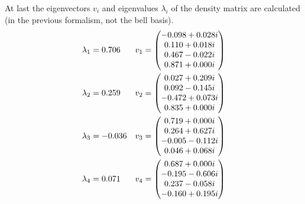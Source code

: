 At last the eigenvectors $v_i$ and eigenvalues $\lambda_i$ of the density matrix are calculated (in the previous formalism, not the bell basis).
\begin{align*}
\lambda_1
    &=\evala
    &v_1
    &=\eveca
    \\
\lambda_2
    &=\evalb
    &v_2
    &=\evecb
    \\
\lambda_3
    &=\evalc
    &v_3
    &=\evecc
    \\
\lambda_4
    &=\evald
    &v_4
    &=\evecd
\end{align*}



